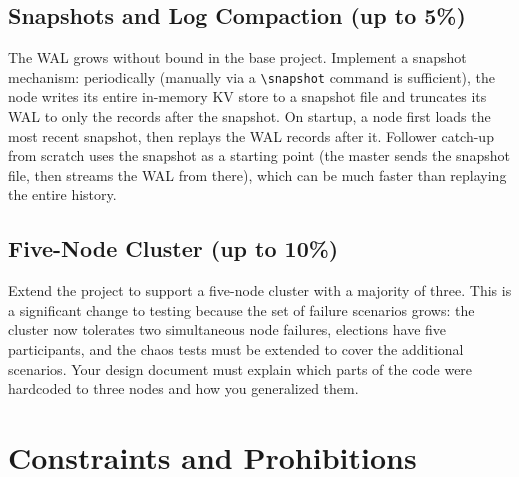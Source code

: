 \documentclass[11pt,a4paper]{article}
\begin{document}
\subsection{Snapshots and Log Compaction (up to 5\%)}
The WAL grows without bound in the base project. Implement a snapshot mechanism: periodically (manually via a \verb|\snapshot| command is sufficient), the node writes its entire in-memory KV store to a snapshot file and truncates its WAL to only the records after the snapshot. On startup, a node first loads the most recent snapshot, then replays the WAL records after it. Follower catch-up from scratch uses the snapshot as a starting point (the master sends the snapshot file, then streams the WAL from there), which can be much faster than replaying the entire history.

\subsection{Five-Node Cluster (up to 10\%)}
Extend the project to support a five-node cluster with a majority of three. This is a significant change to testing because the set of failure scenarios grows: the cluster now tolerates two simultaneous node failures, elections have five participants, and the chaos tests must be extended to cover the additional scenarios. Your design document must explain which parts of the code were hardcoded to three nodes and how you generalized them.

\section{Constraints and Prohibitions}
\end{document}
